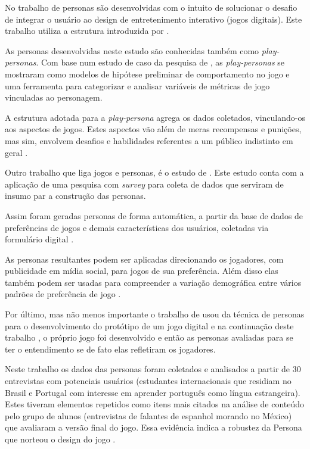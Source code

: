 No trabalho de  personas são desenvolvidas com o intuito de solucionar o desafio de integrar o usuário ao design de entretenimento interativo (jogos digitais). Este trabalho utiliza a estrutura introduzida por .

As personas desenvolvidas neste estudo são conhecidas também como \textit{play-personas}. Com base num estudo de caso da pesquisa de , as \textit{play-personas} se mostraram como modelos de hipótese preliminar de comportamento no jogo e uma ferramenta para categorizar e analisar variáveis de métricas de jogo vinculadas ao personagem.

A estrutura adotada para a \textit{play-persona} agrega os dados coletados, vinculando-os aos aspectos de jogos. Estes aspectos vão além de meras recompensas e punições, mas sim, envolvem desafios e habilidades referentes a um público indistinto em geral \cite{canossa-2009}.

Outro trabalho que liga jogos e personas, é o estudo de . Este estudo conta com a aplicação de uma pesquisa com \textit{survey} para coleta de dados que serviram de insumo par a construção das personas. 

Assim foram geradas personas de forma automática, a partir da base de dados de preferências de jogos e demais características dos usuários, coletadas via formulário digital \cite{salminen-2020}.

As personas resultantes podem ser aplicadas direcionando os jogadores, com publicidade em mídia social, para jogos de sua preferência. Além disso elas também podem ser usadas para compreender a variação demográfica entre vários padrões de preferência de jogo \cite{salminen-2020}.

Por último, mas não menos importante o trabalho de  usou da técnica de personas para o desenvolvimento do protótipo de um jogo digital e na continuação deste trabalho \cite{Salomao_2016}, o próprio jogo foi desenvolvido e então as personas avaliadas para se ter o entendimento se de fato elas refletiram os jogadores.

Neste trabalho \cite{Salomao_2015} os dados das personas foram coletados e analisados a partir de 30 entrevistas com potenciais usuários (estudantes internacionais que residiam no Brasil e Portugal com interesse em aprender português como língua estrangeira). Estes tiveram elementos repetidos como itens mais citados na análise de conteúdo pelo grupo de alunos (entrevistas de falantes de espanhol morando no México) que avaliaram a versão final do jogo. Essa evidência indica a robustez da Persona que norteou o design do jogo \cite{Salomao_2016}.

